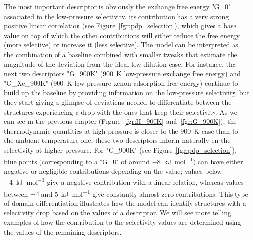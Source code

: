 \documentclass[main]{subfiles}
\begin{document}
The most important descriptor is obviously the exchange free energy "G\_0" associated to the low-pressure selectivity, its contribution has a very strong positive linear correlation (see Figure~\ref{fgr:pdp_selection}), which gives a base value on top of which the other contributions will either reduce the free energy (more selective) or increase it (less selective). The model can be interpreted as the combination of a baseline combined with smaller tweaks that estimate the magnitude of the deviation from the ideal low dilution case. For instance, the next two descriptors "G\_900K" (\SI{900}{\kelvin} low-pressure exchange free energy) and "G\_Xe\_900K" (\SI{900}{\kelvin} low-pressure xenon adsorption free energy) continue to build up the baseline by providing information on the low-pressure selectivity, but they start giving a glimpse of deviations needed to differentiate between the structures experiencing a drop with the ones that keep their selectivity. As we can see in the previous chapter (Figure~\ref{fgr:H_900K} and~\ref{fgr:G_900K}), the thermodynamic quantities at high pressure is closer to the \SI{900}{\kelvin} case than to the ambient temperature one, these two descriptors inform naturally on the selectivity at higher pressure. For "G\_900K" (see Figure~\ref{fgr:pdp_selection}), blue points (corresponding to a "G\_0" of around \SI{-8}{\kilo\joule\per\mole}) can have either negative or negligible contributions depending on the value; values below \SI{-4}{\kilo\joule\per\mole} give a negative contribution with a linear relation, whereas values between $-4$ and \SI{5}{\kilo\joule\per\mole} give constantly almost zero contributions. This type of domain differentiation illustrates how the model can identify structures with a selectivity drop based on the values of a descriptor. We will see more telling examples of how the contribution to the selectivity values are determined using the values of the remaining descriptors.
\end{document}
